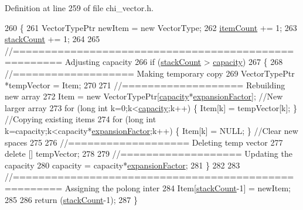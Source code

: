 Definition at line 259 of file chi\+\_\+vector.\+h.


\begin{DoxyCode}
260 \{
261     VectorTypePtr newItem = \textcolor{keyword}{new} VectorType;
262     \hyperlink{class_c_h_i___v_e_c_t_o_r_a0d37a8a4650059da0888be2d9c38487a}{itemCount} += 1;
263     \hyperlink{class_c_h_i___v_e_c_t_o_r_a91ef30712b0ead293dfe1adc29fee555}{stackCount} += 1;
264 
265     \textcolor{comment}{//===================================================== Adjusting capacity}
266     \textcolor{keywordflow}{if} (\hyperlink{class_c_h_i___v_e_c_t_o_r_a91ef30712b0ead293dfe1adc29fee555}{stackCount} > \hyperlink{class_c_h_i___v_e_c_t_o_r_ae73d9f91b472ae07bc32236605934ddb}{capacity})
267     \{
268         \textcolor{comment}{//=================== Making temporary copy}
269         VectorTypePtr *tempVector = Item;
270 
271         \textcolor{comment}{//=================== Rebuilding new array}
272         Item = \textcolor{keyword}{new} VectorTypePtr[\hyperlink{class_c_h_i___v_e_c_t_o_r_ae73d9f91b472ae07bc32236605934ddb}{capacity}*\hyperlink{class_c_h_i___v_e_c_t_o_r_a587c8d362d5149da97ec6519430c4747}{expansionFactor}];                                      \textcolor{comment}{
      //New larger array}
273         \textcolor{keywordflow}{for} (\textcolor{keywordtype}{long} \textcolor{keywordtype}{int} k=0;k<\hyperlink{class_c_h_i___v_e_c_t_o_r_ae73d9f91b472ae07bc32236605934ddb}{capacity};k++)                           \{ Item[k] = tempVector[k]; \}    \textcolor{comment}{
      //Copying existing items}
274         \textcolor{keywordflow}{for} (\textcolor{keywordtype}{long} \textcolor{keywordtype}{int} k=capacity;k<capacity*\hyperlink{class_c_h_i___v_e_c_t_o_r_a587c8d362d5149da97ec6519430c4747}{expansionFactor};k++)     \{ Item[k] = NULL; \}             \textcolor{comment}{
      //Clear new spaces}
275 
276         \textcolor{comment}{//=================== Deleting temp vector}
277         \textcolor{keyword}{delete} [] tempVector;
278 
279         \textcolor{comment}{//=================== Updating the capacity}
280         capacity = capacity*\hyperlink{class_c_h_i___v_e_c_t_o_r_a587c8d362d5149da97ec6519430c4747}{expansionFactor};
281     \}
282 
283     \textcolor{comment}{//===================================================== Assigning the polong inter}
284     Item[\hyperlink{class_c_h_i___v_e_c_t_o_r_a91ef30712b0ead293dfe1adc29fee555}{stackCount}-1] = newItem;
285 
286     \textcolor{keywordflow}{return} (\hyperlink{class_c_h_i___v_e_c_t_o_r_a91ef30712b0ead293dfe1adc29fee555}{stackCount}-1);
287 \}
\end{DoxyCode}
\mbox{\label{class_c_h_i___v_e_c_t_o_r_a8a52d15a1ddb517edfb685765b96a057_a8a52d15a1ddb517edfb685765b96a057}} 
